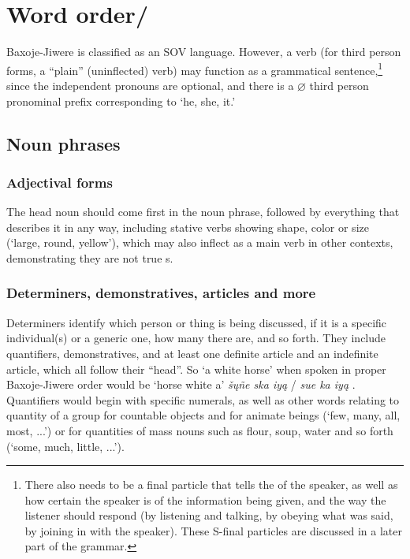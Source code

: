 \documentclass[output=paper]{LSP/langsci}
\begin{document}
\section{Word order/}
Baxoje-Jiwere is classified as an SOV language.  However, a verb (for third person forms, a ``plain'' (uninflected) verb) may function as a grammatical sentence,\footnote{There also needs to be a final particle that tells the  of the speaker, as well as how certain the speaker is of the information being given, and the way the listener should respond (by listening and talking, by obeying what was said, by joining in with the speaker). These S-final particles are discussed in a later part of the grammar.} since the independent pronouns are optional, and there is a $\varnothing$ third person pronominal prefix corresponding to `he, she, it.'  	
			                      
\subsection{Noun phrases} 
	
\subsubsection{Adjectival forms}  The head noun should come first in the noun phrase, followed by everything that describes it in any way, including stative verbs showing shape, color or size (`large, round, yellow'), which may also inflect as a main verb in other contexts, demonstrating they are not true s.  

\subsubsection{Determiners, demonstratives, articles and more}  Determiners identify which person or thing is being discussed, if it is a specific individual(s) or a generic one, how many there are, and so forth.  They include quantifiers, demonstratives, and at least one definite article and an indefinite article, which all follow their ``head''.  So `a white horse' when spoken in proper Baxoje-Jiwere order would be `horse white a' \textit{\v{s}\k{u}ñe ska iy\k{a}}  / \textit{sue ka iy\k{a}} .  Quantifiers would begin with specific numerals, as well as other words relating to quantity of a group for countable objects and for animate beings (`few, many, all, most, ...') or for quantities of mass nouns such as flour, soup, water and so forth (`some, much, little, ...').   
\end{document}
